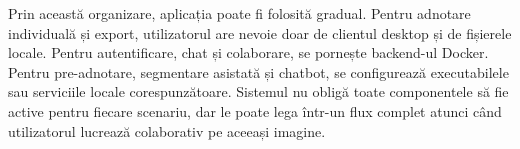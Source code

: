 Prin această organizare, aplicația poate fi folosită gradual. Pentru adnotare individuală și export, utilizatorul are nevoie doar de clientul desktop și de fișierele locale. Pentru autentificare, chat și colaborare, se pornește backend-ul Docker. Pentru pre-adnotare, segmentare asistată și chatbot, se configurează executabilele sau serviciile locale corespunzătoare. Sistemul nu obligă toate componentele să fie active pentru fiecare scenariu, dar le poate lega într-un flux complet atunci când utilizatorul lucrează colaborativ pe aceeași imagine.
\setlength{\parskip}{0pt}
\clearpage
\flushbottom


